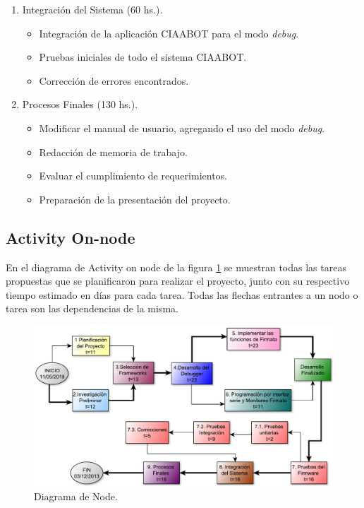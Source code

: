 \begin{enumerate}
	\item Integración del Sistema (60 hs.).
	
	\begin{itemize}
		\item Integración de la aplicación CIAABOT para el modo \emph{debug}.
		\item Pruebas iniciales de todo el sistema CIAABOT.
		\item Corrección de errores encontrados.
	\end{itemize}

	\item Procesos Finales (130 hs.).
	
	\begin{itemize}
		\item Modificar el manual de usuario, agregando el uso del modo \emph{debug}.
		\item Redacción de memoria de trabajo.
		\item Evaluar el cumplimiento de requerimientos.
		\item Preparación de la presentación del proyecto.
	\end{itemize}

\end{enumerate}

\subsection{Activity On-node} 

En el diagrama de Activity on node de la figura  \ref{fig:diagramaNode} se muestran todas las tareas propuestas que se planificaron para realizar el proyecto, junto con su respectivo tiempo estimado en días para cada tarea.
Todas las flechas entrantes a un nodo o tarea son las dependencias de la misma.
 

\begin{figure}[h]
	\centering
	\includegraphics[width=14cm]{./Figures/aon.pdf}
	\caption{Diagrama de Node.}
	\label{fig:diagramaNode}
\end{figure}

